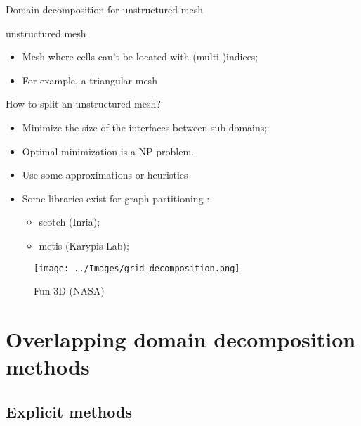 \documentclass[compress,10pt,aspectratio=169]{beamer}
\begin{document}
\begin{frame}[fragile]{Domain decomposition for unstructured mesh}
    \scriptsize

    \begin{multicols}{2}
    \begin{block}{\small unstructured mesh}
        \begin{itemize}
            \item Mesh where cells can't be located with (multi-)indices;
            \item For example, a triangular mesh
        \end{itemize}
    \end{block}

    \begin{exampleblock}{\small How to split an unstructured mesh?}
        \begin{itemize}
            \item Minimize the size of the interfaces between sub-domains;
            \item Optimal minimization is a NP-problem. 
            \item Use some approximations or heuristics
            \item Some libraries exist for graph partitioning :
            \begin{itemize}
                \item {\scriptsize scotch (Inria);}
                \item {\scriptsize metis (Karypis Lab)};
            \end{itemize}
        \end{itemize}
    \end{exampleblock}

    \begin{figure}[h]
    \texttt{[image: ../Images/grid\_decomposition.png]}
    \caption{Fun 3D (NASA)}
    \end{figure}
\end{multicols}
\end{frame}

\section{Overlapping domain decomposition methods}



\subsection{Explicit methods}
\end{document}
